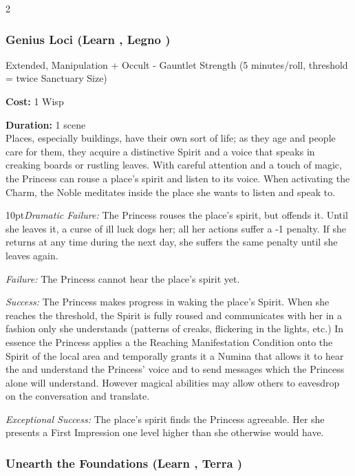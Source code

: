 \begin{multicols}{2}
\subsubsection*{Genius Loci (Learn \textbullet\textbullet\textbullet, Legno \textbullet\textbullet)} 

\noindent Extended, Manipulation + Occult - Gauntlet Strength (5 minutes/roll, threshold = twice Sanctuary Size)

\noindent \textbf{Cost:} 1 Wisp

\noindent \textbf{Duration:} 1 scene \\

\noindent Places, especially buildings, have their own sort of life; as they age and people care for them, they acquire a distinctive Spirit and a voice that speaks in creaking boards or rustling leaves. With careful attention and a touch of magic, the Princess can rouse a place’s spirit and listen to its voice. When activating the Charm, the Noble meditates inside the place she wants to listen and speak to. 

\begin{myindentpar}{10pt}\emph{Dramatic Failure:} The Princess rouses the place’s spirit, but offends it. Until she leaves it, a curse of ill luck dogs her; all her actions suffer a -1 penalty. If she returns at any time during the next day, she suffers the same penalty until she leaves again. 

\emph{Failure:} The Princess cannot hear the place’s spirit yet. 

\emph{Success:} The Princess makes progress in waking the place’s Spirit. When she reaches the threshold, the Spirit is fully roused and communicates with her in a fashion only she
understands (patterns of creaks, flickering in the lights, etc.) In essence the Princess applies a the Reaching Manifestation Condition onto the Spirit of the local area and temporally grants it a Numina that allows it to hear the and understand the Princess' voice and to send messages which the Princess alone will understand. However magical abilities may allow others to eavesdrop on the conversation and translate. 

\emph{Exceptional Success:} The place’s spirit finds the Princess agreeable. Her she presents a First Impression one level higher than she otherwise would have. \end{myindentpar}

\subsubsection*{Unearth the Foundations (Learn \textbullet\textbullet\textbullet, Terra \textbullet)}


\end{multicols}
